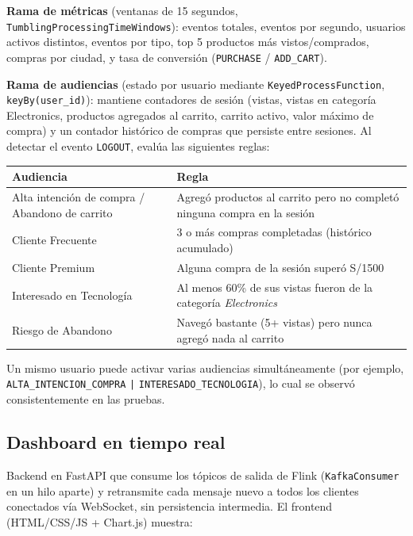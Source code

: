 \documentclass[11pt,a4paper]{article}
\begin{document}
\textbf{Rama de métricas} (ventanas de 15 segundos, \texttt{TumblingProcessingTimeWindows}):
eventos totales, eventos por segundo, usuarios activos distintos, eventos
por tipo, top 5 productos más vistos/comprados, compras por ciudad, y
tasa de conversión (\texttt{PURCHASE} / \texttt{ADD\_CART}).

\textbf{Rama de audiencias} (estado por usuario mediante
\texttt{KeyedProcessFunction}, \texttt{keyBy(user\_id)}): mantiene
contadores de sesión (vistas, vistas en categoría Electronics, productos
agregados al carrito, carrito activo, valor máximo de compra) y un
contador histórico de compras que persiste entre sesiones. Al detectar el
evento \texttt{LOGOUT}, evalúa las siguientes reglas:

\begin{center}
\begin{longtable}{@{}p{3.6cm}p{9cm}@{}}
\toprule
\textbf{Audiencia} & \textbf{Regla} \\
\midrule
\endhead
Alta intención de compra / Abandono de carrito & Agregó productos al carrito pero no completó ninguna compra en la sesión \\
Cliente Frecuente & 3 o más compras completadas (histórico acumulado) \\
Cliente Premium & Alguna compra de la sesión superó S/1500 \\
Interesado en Tecnología & Al menos 60\% de sus vistas fueron de la categoría \emph{Electronics} \\
Riesgo de Abandono & Navegó bastante (5+ vistas) pero nunca agregó nada al carrito \\
\bottomrule
\end{longtable}
\end{center}

Un mismo usuario puede activar varias audiencias simultáneamente (por
ejemplo, \texttt{ALTA\_INTENCION\_COMPRA} \texttt{|} \texttt{INTERESADO\_TECNOLOGIA}),
lo cual se observó consistentemente en las pruebas.

\subsection{Dashboard en tiempo real}

Backend en FastAPI que consume los tópicos de salida de Flink
(\texttt{KafkaConsumer} en un hilo aparte) y retransmite cada mensaje
nuevo a todos los clientes conectados vía WebSocket, sin persistencia
intermedia. El frontend (HTML/CSS/JS + Chart.js) muestra:
\end{document}
